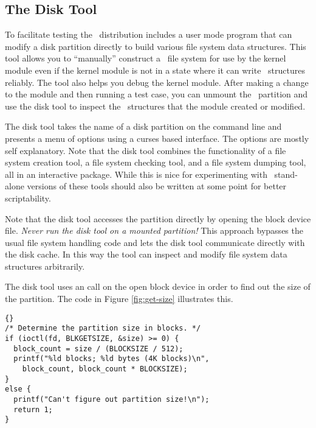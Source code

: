\subsection{The Disk Tool}
\label{sec:implementation-disktool}

To facilitate testing the \GenericFS\ distribution includes a user mode program that can modify
a disk partition directly to build various file system data structures. This tool allows you to
``manually'' construct a \GenericFS\ file system for use by the kernel module even if the kernel
module is not in a state where it can write \GenericFS\ structures reliably. The tool also helps
you debug the kernel module. After making a change to the module and then running a test case,
you can unmount the \GenericFS\ partition and use the disk tool to inspect the \GenericFS\
structures that the module created or modified.

The disk tool takes the name of a disk partition on the command line and presents a menu of
options using a curses based interface. The options are mostly self explanatory. Note that the
disk tool combines the functionality of a file system creation tool, a file system checking
tool, and a file system dumping tool, all in an interactive package. While this is nice for
experimenting with \GenericFS\ stand-alone versions of these tools should also be written at
some point for better scriptability.

Note that the disk tool accesses the partition directly by opening the block device file.
\emph{Never run the disk tool on a mounted partition!} This approach bypasses the usual file
system handling code and lets the disk tool communicate directly with the disk cache. In this
way the tool can inspect and modify file system data structures arbitrarily.

The disk tool uses an  call on the open block device in order to find out the size
of the partition. The code in Figure \ref{fig:get-size} illustrates this.

\begin{figure*}[tp]
  \centering
  \begin{wbigbox}
\begin{lstlisting}{}
/* Determine the partition size in blocks. */
if (ioctl(fd, BLKGETSIZE, &size) >= 0) {
  block_count = size / (BLOCKSIZE / 512);
  printf("%ld blocks; %ld bytes (4K blocks)\n",
    block_count, block_count * BLOCKSIZE);
}
else {
  printf("Can't figure out partition size!\n");
  return 1;
}
\end{lstlisting}
  \end{wbigbox}
  \caption{Getting Partition Size}
  \label{fig:get-size}
\end{figure*}

